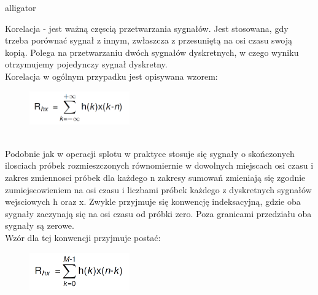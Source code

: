 \documentclass[12pt]{article}
\begin{document}
\begin{labeling}{alligator}
\item [Korelacja] - jest ważną częscią przetwarzania sygnałów. Jest stosowana, gdy trzeba porównać sygnał z innym, zwłaszcza z przesuniętą na osi czasu swoją kopią.
Polega na przetwarzaniu dwóch sygnałów dyskretnych, w czego wyniku otrzymujemy pojedynczy sygnał dyskretny.
\\Korelacja w ogólnym przypadku jest opisywana wzorem:
\begin{figure}[h!]
 \centering
 \includegraphics[width=4.3cm]{kor.PNG}
 \vspace{-0.3cm}
 \label{kr}
\end{figure}
\\Podobnie jak w operacji splotu w praktyce stosuje się sygnały o skończonych ilosciach próbek rozmieszczonych równomiernie w dowolnych miejscach osi czasu i zakres zmiennosci próbek dla każdego n zakresy sumowań zmieniają się zgodnie zumiejscowieniem na osi czasu i liczbami próbek każdego z dyskretnych sygnałów wejsciowych h oraz x. Zwykle przyjmuje się konwencję indeksacyjną, gdzie oba sygnały zaczynają się  na osi czasu od próbki zero. Poza granicami przedziału oba sygnały są zerowe. 
\\Wzór dla tej konwencji przyjmuje postać: 
\begin{figure}[h!]
 \centering
 \includegraphics[width=4.3cm]{korW.PNG}
 \vspace{-0.3cm}
 \label{kw}
\end{figure}


\end{labeling}

\end{document}
